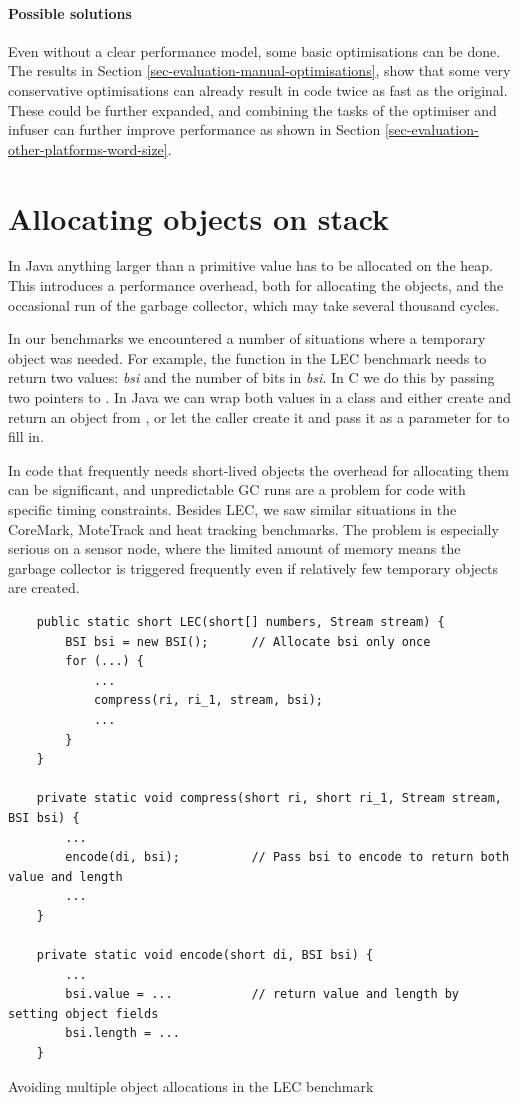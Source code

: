 \paragraph{Possible solutions}
Even without a clear performance model, some basic optimisations can be done. The results in Section \ref{sec-evaluation-manual-optimisations}, show that some very conservative optimisations can already result in code twice as fast as the original. These could be further expanded, and combining the tasks of the optimiser and infuser can further improve performance as shown in Section \ref{sec-evaluation-other-platforms-word-size}.




\section{Allocating objects on stack}
\label{sec-no-gc}
In Java anything larger than a primitive value has to be allocated on the heap. This introduces a performance overhead, both for allocating the objects, and the occasional run of the garbage collector, which may take several thousand cycles.

In our benchmarks we encountered a number of situations where a temporary object was needed. For example, the  function in the LEC benchmark needs to return two values: \emph{bsi} and the number of bits in \emph{bsi}. In C we do this by passing two pointers to . In Java we can wrap both values in a class and either create and return an object from , or let the caller create it and pass it as a parameter for  to fill in.

In code that frequently needs short-lived objects the overhead for allocating them can be significant, and unpredictable GC runs are a problem for code with specific timing constraints. Besides LEC, we saw similar situations in the CoreMark, MoteTrack and heat tracking benchmarks. The problem is especially serious on a sensor node, where the limited amount of memory means the garbage collector is triggered frequently even if relatively few temporary objects are created.

\begin{listing}
\begin{verbatim}
    public static short LEC(short[] numbers, Stream stream) {
        BSI bsi = new BSI();      // Allocate bsi only once
        for (...) {
            ...
            compress(ri, ri_1, stream, bsi);
            ...
        }
    }

    private static void compress(short ri, short ri_1, Stream stream, BSI bsi) {
        ...
        encode(di, bsi);          // Pass bsi to encode to return both value and length
        ...
    }

    private static void encode(short di, BSI bsi) {
        ...
        bsi.value = ...           // return value and length by setting object fields
        bsi.length = ...
    }
\end{verbatim}
\caption{Avoiding multiple object allocations in the LEC benchmark}
\label{lst-lec-avoiding-object-allocations}
\end{listing}

